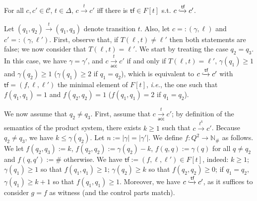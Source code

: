 \documentclass[10pt,a4paper]{article}
\let\mathbb\mathds
\renewcommand{\geq}{\geqslant}
\renewcommand{\leq}{\leqslant}
\newcommand{\nats}{\mathbb{N}}
\newcommand{\deff}{:=}
\newcommand{\size}[1]{|#1|}
\newcommand{\config}{\gamma}
\newcommand{\step}[1]{\xrightarrow{#1}}
\newcommand{\transitions}{\Delta}
\newcommand*{\states}{Q}
\newcommand*{\atrans}{t}
\newcommand{\trans}[1]{\xrightarrow{#1}}       %
\newcommand{\btransitions}{T}
\newcommand*{\abuchistate}{\ell}
\newcommand*{\bstate}{\abuchistate}
\newcommand{\prodconfigs}{\mathcal{C}}
\newcommand{\prodconfig}{c}
\newcommand{\accstep}[1]{\xrightarrow[\mathsf{acc}]{#1}}
\newcommand*{\dummysymb}{\#}
\newcommand*{\natsanddummy}{\nats_{\dummysymb}}
\newcommand*{\transfersof}[1]{F[#1]}
\newcommand*{\atf}{\mathsf{tf}}
\newcommand*{\flowstep}[1]{\xhookrightarrow{#1}}
\begin{document}
\begin{lemmarep}
	\label{flow-one-trans}
	For all \(\prodconfig, \prodconfig' \in \prodconfigs\), \(\atrans \in \transitions\), \(\prodconfig \step{\atrans} \prodconfig'\) iff there is \(\atf \in \transfersof{\atrans}\) s.t.
	\(\prodconfig \flowstep{\atf} \prodconfig'\).
\end{lemmarep}
%
\begin{appendixproof}
	Let \((q_1,q_2) \trans{\atrans} (q_1,q_3)\) denote transition \(\atrans\).
	Also, let \(\prodconfig=: (\config, \bstate)\) and \(\prodconfig' =: (\config, \bstate')\).
	First, observe that, if \(\btransitions(\bstate, \atrans) \ne \bstate'\) then both statements are false; we now consider that \(\btransitions(\bstate, \atrans) = \bstate'\).
	We start by treating the case \(q_2 = q_3\).
	In this case, we have \(\config = \config'\), and \(\prodconfig \accstep{\atrans} \prodconfig'\) if and only if \(\btransitions(\bstate, \atrans) = \bstate'\), \(\config(q_1) \geq 1\) and \(\config(q_2) \geq 1\) (\(\config(q_1) \geq 2\) if \(q_1 = q_2\)), which is equivalent to \(\prodconfig \flowstep{\atf} \prodconfig'\) with \(\atf = (f,\bstate,\bstate')\) the minimal element of \(\transfersof{\atrans}\), \emph{i.e.}, the one such that \(f(q_1,q_1) = 1\) and \(f(q_2,q_2) = 1\) (\(f(q_1,q_1) = 2\) if \(q_1 = q_2\)).

	We now assume that \(q_2 \ne q_3\).
	First, assume that \(\prodconfig \accstep{\atrans} \prodconfig'\); by definition of the semantics of the product system, there exists \(k \geq 1\) such that \(\prodconfig \step{\atrans^k} \prodconfig'\).
	Because \(q_2 \ne q_3\), we have \(k \leq \config(q_2)\).
	Let \(n \deff \size{\config} = \size{\config'}\).
	We define \(f : \states^2 \to \natsanddummy\) as follows.
	We let \(f(q_2,q_3) := k\), \(f(q_2,q_2) := \config(q_2) -k\), \(f(q,q) := \config(q)\) for all \(q \ne q_2\) and \(f(q,q') := \dummysymb\) otherwise.
	We have \(\atf := (f,\bstate, \bstate') \in \transfersof{\atrans}\), indeed: \(k \geq 1\); \(\config(q_1) \geq 1\) so that \(f(q_1,q_1) \geq 1\); \(\config(q_2) \geq k\) so that \(f(q_2,q_2) \geq 0\); if \(q_1 =q_2\), \(\config(q_1) \geq k+1\) so that \(f(q_1,q_1) \geq 1\).
	Moreover, we have \(\prodconfig \flowstep{\atf} \prodconfig'\), as it suffices to consider \(g = f\) as witness (and the control parts match).


\end{appendixproof}
\end{document}
